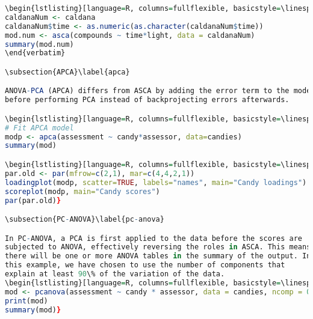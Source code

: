 \begin{lstlisting}[language=R, columns=fullflexible, basicstyle=\linespread{0.85}\small\ttfamily, stringstyle=\color{DarkGreen}, keywordstyle=\color{blue}, commentstyle=\color{DarkGreen},]
\begin{lstlisting}[language=R, columns=fullflexible, basicstyle=\linespread{0.85}\small\ttfamily, stringstyle=\color{DarkGreen}, keywordstyle=\color{blue}, commentstyle=\color{DarkGreen},]
caldanaNum <- caldana
caldanaNum$time <- as.numeric(as.character(caldanaNum$time))
mod.num <- asca(compounds ~ time*light, data = caldanaNum)
summary(mod.num)
\end{verbatim}

\subsection{APCA}\label{apca}

ANOVA-PCA (APCA) differs from ASCA by adding the error term to the model
before performing PCA instead of backprojecting errors afterwards.

\begin{lstlisting}[language=R, columns=fullflexible, basicstyle=\linespread{0.85}\small\ttfamily, stringstyle=\color{DarkGreen}, keywordstyle=\color{blue}, commentstyle=\color{DarkGreen},]
# Fit APCA model
modp <- apca(assessment ~ candy*assessor, data=candies)
summary(mod)

\begin{lstlisting}[language=R, columns=fullflexible, basicstyle=\linespread{0.85}\small\ttfamily, stringstyle=\color{DarkGreen}, keywordstyle=\color{blue}, commentstyle=\color{DarkGreen},]
par.old <- par(mfrow=c(2,1), mar=c(4,4,2,1))
loadingplot(modp, scatter=TRUE, labels="names", main="Candy loadings")
scoreplot(modp, main="Candy scores")
par(par.old)}

\subsection{PC-ANOVA}\label{pc-anova}

In PC-ANOVA, a PCA is first applied to the data before the scores are
subjected to ANOVA, effectively reversing the roles in ASCA. This means
there will be one or more ANOVA tables in the summary of the output. In
this example, we have chosen to use the number of components that
explain at least 90\% of the variation of the data.
\begin{lstlisting}[language=R, columns=fullflexible, basicstyle=\linespread{0.85}\small\ttfamily, stringstyle=\color{DarkGreen}, keywordstyle=\color{blue}, commentstyle=\color{DarkGreen},]
mod <- pcanova(assessment ~ candy * assessor, data = candies, ncomp = 0.9)
print(mod)
summary(mod)}


\end{lstlisting}
